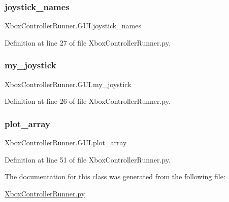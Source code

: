 \subsubsection{\texorpdfstring{joystick\+\_\+names}{joystick\_names}}
{\footnotesize\ttfamily Xbox\+Controller\+Runner.\+G\+U\+I.\+joystick\+\_\+names}



Definition at line 27 of file Xbox\+Controller\+Runner.\+py.

\mbox{\label{class_xbox_controller_runner_1_1_g_u_i_aaadfdb49cdbd847d87a2b634be729852}} 
\subsubsection{\texorpdfstring{my\+\_\+joystick}{my\_joystick}}
{\footnotesize\ttfamily Xbox\+Controller\+Runner.\+G\+U\+I.\+my\+\_\+joystick}



Definition at line 26 of file Xbox\+Controller\+Runner.\+py.

\mbox{\label{class_xbox_controller_runner_1_1_g_u_i_a53a92c59b526c922618e6998170b9b8d}} 
\subsubsection{\texorpdfstring{plot\+\_\+array}{plot\_array}}
{\footnotesize\ttfamily Xbox\+Controller\+Runner.\+G\+U\+I.\+plot\+\_\+array}



Definition at line 51 of file Xbox\+Controller\+Runner.\+py.



The documentation for this class was generated from the following file\+:\begin{DoxyCompactItemize}
\item 
\mbox{\hyperlink{_xbox_controller_runner_8py}{Xbox\+Controller\+Runner.\+py}}\end{DoxyCompactItemize}
